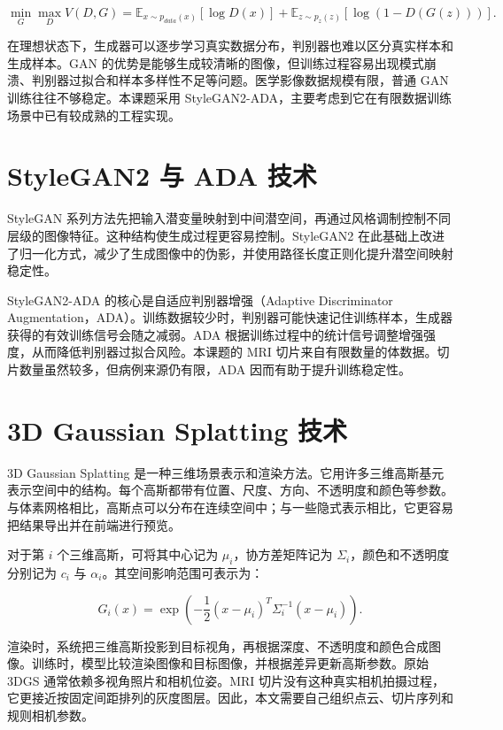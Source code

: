 \begin{equation}
\min_G \max_D V(D,G)=\mathbb{E}_{x\sim p_{data}(x)}[\log D(x)] + \mathbb{E}_{z\sim p_z(z)}[\log(1-D(G(z)))] .
\end{equation}

在理想状态下，生成器可以逐步学习真实数据分布，判别器也难以区分真实样本和生成样本。GAN 的优势是能够生成较清晰的图像，但训练过程容易出现模式崩溃、判别器过拟合和样本多样性不足等问题。医学影像数据规模有限，普通 GAN 训练往往不够稳定。本课题采用 StyleGAN2-ADA，主要考虑到它在有限数据训练场景中已有较成熟的工程实现。

\section{StyleGAN2 与 ADA 技术}
StyleGAN 系列方法先把输入潜变量映射到中间潜空间，再通过风格调制控制不同层级的图像特征\cite{karras2019stylegan}。这种结构使生成过程更容易控制。StyleGAN2 在此基础上改进了归一化方式，减少了生成图像中的伪影，并使用路径长度正则化提升潜空间映射稳定性\cite{karras2020stylegan2}。

StyleGAN2-ADA 的核心是自适应判别器增强（Adaptive Discriminator Augmentation，ADA）。训练数据较少时，判别器可能快速记住训练样本，生成器获得的有效训练信号会随之减弱。ADA 根据训练过程中的统计信号调整增强强度，从而降低判别器过拟合风险\cite{karras2020ada}。本课题的 MRI 切片来自有限数量的体数据。切片数量虽然较多，但病例来源仍有限，ADA 因而有助于提升训练稳定性。

\section{3D Gaussian Splatting 技术}
3D Gaussian Splatting 是一种三维场景表示和渲染方法。它用许多三维高斯基元表示空间中的结构。每个高斯都带有位置、尺度、方向、不透明度和颜色等参数。与体素网格相比，高斯点可以分布在连续空间中；与一些隐式表示相比，它更容易把结果导出并在前端进行预览\cite{kerbl20233dgs}。

对于第 $i$ 个三维高斯，可将其中心记为 $\mu_i$，协方差矩阵记为 $\Sigma_i$，颜色和不透明度分别记为 $c_i$ 与 $\alpha_i$。其空间影响范围可表示为：

\begin{equation}
G_i(x)=\exp\left(-\frac{1}{2}(x-\mu_i)^{T}\Sigma_i^{-1}(x-\mu_i)\right).
\end{equation}

渲染时，系统把三维高斯投影到目标视角，再根据深度、不透明度和颜色合成图像。训练时，模型比较渲染图像和目标图像，并根据差异更新高斯参数。原始 3DGS 通常依赖多视角照片和相机位姿。MRI 切片没有这种真实相机拍摄过程，它更接近按固定间距排列的灰度图层。因此，本文需要自己组织点云、切片序列和规则相机参数。

